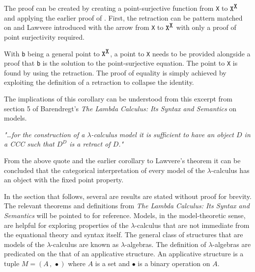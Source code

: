 
The proof can be created by creating a point-surjective function from \verb|X|
to $\verb|X|^{\verb|X|}$ and applying the earlier proof of
. First, the retraction can be pattern matched on and
Lawvere introduced with the arrow from \verb|X| to $\verb|X|^{\verb|X|}$ with
only a proof of point surjectivity required.


With \verb|b| being a general point to $\verb|X|^{\verb|X|}$, a point to
\verb|X| needs to be provided alongside a proof that \verb|b| is the solution to
the point-surjective equation. The point to \verb|X| is found by
using the retraction. The proof of equality is simply achieved by exploiting the
definition of a retraction to collapse the identity.



The implications of this corollary can be understood from this excerpt from section
5 of Barendregt's \textit{The Lambda Calculus: Its Syntax and Semantics}
\cite{barendregt1992lambda} on
models.

\begin{displayquote}
\textit{"\ldots for the construction of a $\lambda$-calculus model it
is sufficient to have an object $D$ in a CCC such that $D^D$ is a retract of
$D$."}
\end{displayquote}

From the above quote and the earlier corollary to Lawvere's theorem it can be
concluded that the categorical interpretation of every model of the
$\lambda$-calculus has an object with the fixed point property.

In the section that follows, several are results are stated without proof for
brevity. The relevant theorems and definitions from \textit{The Lambda Calculus:
Its Syntax and Semantics} will be pointed to for reference. Models, in the
model-theoretic sense, are helpful for exploring properties of the
$\lambda$-calculus that are not immediate from the equational theory and syntax
itself. The general class of structures that are models of the
$\lambda$-calculus are known as $\lambda$-algebras. The definition of
$\lambda$-algebras are predicated on the that of an applicative structure. An
applicative structure is a tuple $M = (A \, , \, \bullet)$ where $A$ is a set
and $\bullet$ is a binary operation on $A$.

